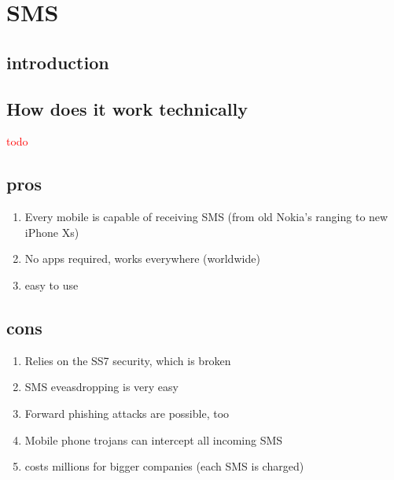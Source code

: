 \section{SMS}

\subsection{introduction}

\blindtext

\subsection{How does it work technically}

\textcolor{red}{todo}

\subsection{pros}

\begin{enumerate}
	\item Every mobile is capable of receiving SMS (from old Nokia's ranging to new iPhone Xs)
	\item No apps required, works everywhere (worldwide)
	\item easy to use
\end{enumerate}

\subsection{cons}

\begin{enumerate}
	\item Relies on the SS7 security, which is broken
	\item SMS eveasdropping is very easy
	\item Forward phishing attacks are possible, too
	\item Mobile phone trojans can intercept all incoming SMS
	\item costs millions for bigger companies (each SMS is charged)
\end{enumerate}
